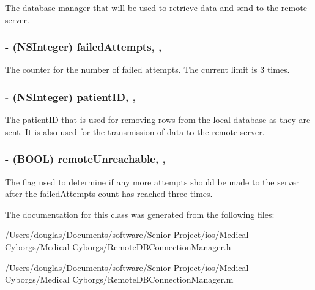The database manager that will be used to retrieve data and send to the remote server. \hypertarget{interface_remote_d_b_connection_manager_aea06d1743882f6b59247e590cdd0513f}{
\subsubsection[{failed\-Attempts}]{\setlength{\rightskip}{0pt plus 5cm}-\/ (N\-S\-Integer) failed\-Attempts\hspace{0.3cm}{\ttfamily [read]}, {\ttfamily [write]}, {\ttfamily [atomic]}}}\label{interface_remote_d_b_connection_manager_aea06d1743882f6b59247e590cdd0513f}
The counter for the number of failed attempts. The current limit is 3 times. \hypertarget{interface_remote_d_b_connection_manager_a984d4293c7de824df8ab8b7a8510c15e}{
\subsubsection[{patient\-I\-D}]{\setlength{\rightskip}{0pt plus 5cm}-\/ (N\-S\-Integer) patient\-I\-D\hspace{0.3cm}{\ttfamily [read]}, {\ttfamily [write]}, {\ttfamily [atomic]}}}\label{interface_remote_d_b_connection_manager_a984d4293c7de824df8ab8b7a8510c15e}
The patient\-I\-D that is used for removing rows from the local database as they are sent. It is also used for the transmission of data to the remote server. \hypertarget{interface_remote_d_b_connection_manager_ad3cb931f4c5147c3595679f241a0bf48}{
\subsubsection[{remote\-Unreachable}]{\setlength{\rightskip}{0pt plus 5cm}-\/ (B\-O\-O\-L) remote\-Unreachable\hspace{0.3cm}{\ttfamily [read]}, {\ttfamily [write]}, {\ttfamily [atomic]}}}\label{interface_remote_d_b_connection_manager_ad3cb931f4c5147c3595679f241a0bf48}
The flag used to determine if any more attempts should be made to the server after the failed\-Attempts count has reached three times. 

The documentation for this class was generated from the following files\-:\begin{DoxyCompactItemize}
\item 
/\-Users/douglas/\-Documents/software/\-Senior Project/ios/\-Medical Cyborgs/\-Medical Cyborgs/Remote\-D\-B\-Connection\-Manager.\-h\item 
/\-Users/douglas/\-Documents/software/\-Senior Project/ios/\-Medical Cyborgs/\-Medical Cyborgs/Remote\-D\-B\-Connection\-Manager.\-m\end{DoxyCompactItemize}
